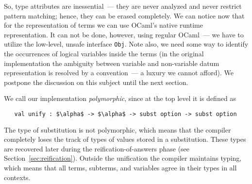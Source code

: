 So, type attributes are inessential~--- they are never analyzed and never restrict pattern matching; hence,
they can be erased completely.
We can notice now that for the representation of terms we can use OCaml's native runtime representation.
It can not be done, however, using regular OCaml~--- we have to utilize the low-level, unsafe interface \lstinline{Obj}.
Note also, we need some way to identify the occurrences of logical variables inside the terms (in the original \miniKanren
implementation the ambiguity between variable and non-variable datum representation is resolved by a convention~--- a luxury
we cannot afford).  We postpone the discussion on this subject until the next section.



We call our implementation \emph{polymorphic}, since at the top level it is defined as

\begin{lstlisting}
   val unify : $\alpha$ -> $\alpha$ -> subst option -> subst option
\end{lstlisting}

The type of substitution is not polymorphic, which means that the compiler completely loses the track
of types of values stored in a substitution. These types are recovered later during the reification-of-answers phase (see Section~\ref{sec:reification}).
Outside the unification the compiler maintains typing, which means that all terms, subterms, and variables agree in their types
in all contexts.
